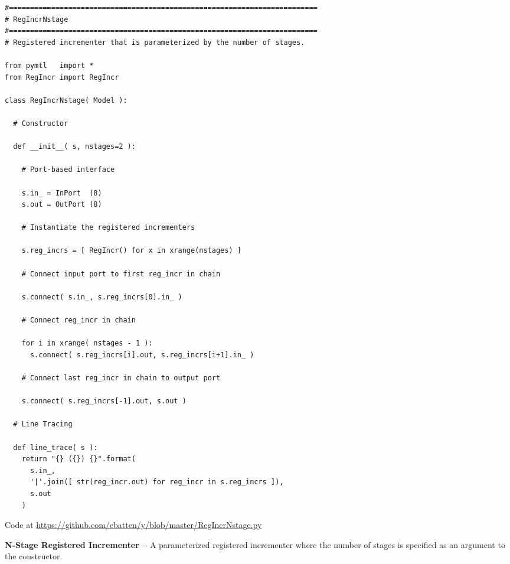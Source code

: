

  \begin{lstlisting}[xleftmargin={0.9in}]
#=========================================================================
# RegIncrNstage
#=========================================================================
# Registered incrementer that is parameterized by the number of stages.

from pymtl   import *
from RegIncr import RegIncr

class RegIncrNstage( Model ):

  # Constructor

  def __init__( s, nstages=2 ):

    # Port-based interface

    s.in_ = InPort  (8)
    s.out = OutPort (8)

    # Instantiate the registered incrementers

    s.reg_incrs = [ RegIncr() for x in xrange(nstages) ]

    # Connect input port to first reg_incr in chain

    s.connect( s.in_, s.reg_incrs[0].in_ )

    # Connect reg_incr in chain

    for i in xrange( nstages - 1 ):
      s.connect( s.reg_incrs[i].out, s.reg_incrs[i+1].in_ )

    # Connect last reg_incr in chain to output port

    s.connect( s.reg_incrs[-1].out, s.out )

  # Line Tracing

  def line_trace( s ):
    return "{} ({}) {}".format(
      s.in_,
      '|'.join([ str(reg_incr.out) for reg_incr in s.reg_incrs ]),
      s.out
    )
\end{lstlisting}

  \centerline{\small Code at
    \url{https://github.com/cbatten/y/blob/master/RegIncrNstage.py}}

  \caption{\textbf{N-Stage Registered Incrementer --} A parameterized
    registered incrementer where the number of stages is specified as an
    argument to the constructor.}
  \label{code-tut3-regincr-nstage}


